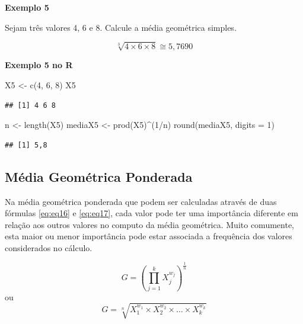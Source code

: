 \documentclass[
]{book}
\newenvironment{Shaded}{\begin{snugshade}}{\end{snugshade}}
\newcommand{\AttributeTok}[1]{\textcolor[rgb]{0.77,0.63,0.00}{#1}}
\newcommand{\DecValTok}[1]{\textcolor[rgb]{0.00,0.00,0.81}{#1}}
\newcommand{\FunctionTok}[1]{\textcolor[rgb]{0.00,0.00,0.00}{#1}}
\newcommand{\NormalTok}[1]{#1}
\newcommand{\OtherTok}[1]{\textcolor[rgb]{0.56,0.35,0.01}{#1}}
\newcommand{\SpecialCharTok}[1]{\textcolor[rgb]{0.00,0.00,0.00}{#1}}
\begin{document}
\textbf{Exemplo 5}

Sejam três valores 4, 6 e 8. Calcule a média geométrica simples.

\begin{equation*}
  \sqrt[3]{4 \times 6 \times 8} \cong 5,7690
\end{equation*}

\textbf{Exemplo 5 no R}

\begin{Shaded}
\begin{Highlighting}[]
\NormalTok{X5 }\OtherTok{\textless{}{-}} \FunctionTok{c}\NormalTok{(}\DecValTok{4}\NormalTok{, }\DecValTok{6}\NormalTok{, }\DecValTok{8}\NormalTok{)}
\NormalTok{X5}
\end{Highlighting}
\end{Shaded}

\begin{verbatim}
## [1] 4 6 8
\end{verbatim}

\begin{Shaded}
\begin{Highlighting}[]
\NormalTok{n }\OtherTok{\textless{}{-}} \FunctionTok{length}\NormalTok{(X5)}
\NormalTok{mediaX5 }\OtherTok{\textless{}{-}} \FunctionTok{prod}\NormalTok{(X5)}\SpecialCharTok{\^{}}\NormalTok{(}\DecValTok{1}\SpecialCharTok{/}\NormalTok{n)}
\FunctionTok{round}\NormalTok{(mediaX5, }\AttributeTok{digits =} \DecValTok{1}\NormalTok{)}
\end{Highlighting}
\end{Shaded}

\begin{verbatim}
## [1] 5,8
\end{verbatim}

\hypertarget{muxe9dia-geomuxe9trica-ponderada}{%
\subsection{Média Geométrica Ponderada}\label{muxe9dia-geomuxe9trica-ponderada}}

Na média geométrica ponderada que podem ser calculadas através de duas fórmulas \eqref{eq:eq16} e \eqref{eq:eq17}, cada valor pode ter uma importância diferente em relação aos outros valores no computo da média geométrica. Muito comumente, esta maior ou menor importância pode estar associada a frequência dos valores considerados no cálculo.

\begin{equation}
    G = \left(\prod_{j=1}^{k} X_j^{w_j} \right)^{\frac{1}{n}}
    \label{eq:eq16}
\end{equation}
ou
\begin{equation}
    G = \sqrt[n]{X_1^{w_1} \times X_2^{w_2} \times \ldots \times X_k^{w_k}}
    \label{eq:eq17}
\end{equation}
\end{document}
